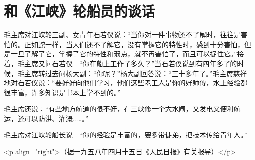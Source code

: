 \section[和《江峡》轮船员的谈话（一九五八年三月二十八日）]{和《江峡》轮船员的谈话}


毛主席对江峡轮三副、女青年石若仪说：“当你对一件事物还不了解时，往往是害怕的。正如蛇一样，当人们还不了解它，没有掌握它的特性时，感到十分害怕，但是一旦了解了它，掌握了它的特性和弱点，就不再害怕了，而且可以捉住它。”接着，毛主席又问石若仪：“你在船上工作了多久？”当石若仪说到有四年多了的时候，毛主席转过去问杨大副：“你呢？”杨大副回答说：“三十多年了。”毛主席慈祥地对石若仪说：“要好好向他们学习，他们这些老工人是你的好师傅，水上经验都很丰富，许多知识是书本上学不到的。”

毛主席还说：“有些地方航道的很不好，在三峡修一个大水闸，又发电又便利航运，还可以防洪、灌溉……。”

毛主席对江峡轮船长说：“你的经验是丰富的，要多带徒弟，把技术传给青年人。”

<p align="right">（据一九五八年四月十五日《人民日报》有关报导）</p>


